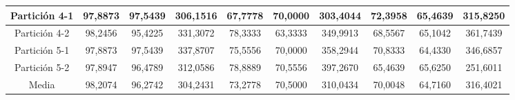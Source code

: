 \documentclass[12pt]{article}
\begin{document}
\begin{table}[H]
{\begin{tabular}{|c|ccc|ccc|ccc|}
Partición 4-1 & \multicolumn{1}{c|}{97,8873}                                                   & \multicolumn{1}{c|}{97,5439}                                                 & 306,1516 & \multicolumn{1}{c|}{67,7778}                                                  & \multicolumn{1}{c|}{70,0000}                                                 & 303,4044 & \multicolumn{1}{c|}{72,3958}                                                  & \multicolumn{1}{c|}{65,4639}                                                 & 315,8250 \\ \hline
Partición 4-2 & \multicolumn{1}{c|}{98,2456}                                                   & \multicolumn{1}{c|}{95,4225}                                                 & 331,3072 & \multicolumn{1}{c|}{78,3333}                                                  & \multicolumn{1}{c|}{63,3333}                                                 & 349,9913 & \multicolumn{1}{c|}{68,5567}                                                  & \multicolumn{1}{c|}{65,1042}                                                 & 361,7439 \\ \hline
Partición 5-1 & \multicolumn{1}{c|}{97,8873}                                                   & \multicolumn{1}{c|}{97,5439}                                                 & 337,8707 & \multicolumn{1}{c|}{75,5556}                                                  & \multicolumn{1}{c|}{70,0000}                                                 & 358,2944 & \multicolumn{1}{c|}{70,8333}                                                  & \multicolumn{1}{c|}{64,4330}                                                 & 346,6857 \\ \hline
Partición 5-2 & \multicolumn{1}{c|}{97,8947}                                                   & \multicolumn{1}{c|}{96,4789}                                                 & 312,0586 & \multicolumn{1}{c|}{78,8889}                                                  & \multicolumn{1}{c|}{70,5556}                                                 & 397,2670 & \multicolumn{1}{c|}{65,4639}                                                  & \multicolumn{1}{c|}{65,6250}                                                 & 251,6011 \\ \hline
Media         & \multicolumn{1}{c|}{98,2074}                                                   & \multicolumn{1}{c|}{96,2742}                                                 & 304,2431 & \multicolumn{1}{c|}{73,2778}                                                  & \multicolumn{1}{c|}{70,5000}                                                 & 310,0434 & \multicolumn{1}{c|}{70,0048}                                                  & \multicolumn{1}{c|}{64,7160}                                                 & 316,4021 \\ \hline
\end{tabular}}
\end{table}
\end{document}
